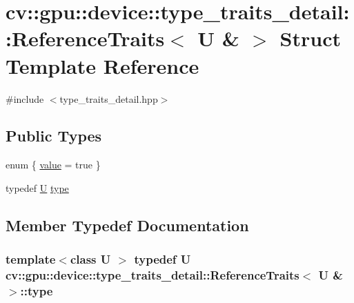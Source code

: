 \hypertarget{structcv_1_1gpu_1_1device_1_1type__traits__detail_1_1ReferenceTraits_3_01U_01_6_01_4}{\section{cv\-:\-:gpu\-:\-:device\-:\-:type\-\_\-traits\-\_\-detail\-:\-:Reference\-Traits$<$ U \& $>$ Struct Template Reference}
\label{structcv_1_1gpu_1_1device_1_1type__traits__detail_1_1ReferenceTraits_3_01U_01_6_01_4}
}


{\ttfamily \#include $<$type\-\_\-traits\-\_\-detail.\-hpp$>$}

\subsection*{Public Types}
\begin{DoxyCompactItemize}
\item 
enum \{ \hyperlink{structcv_1_1gpu_1_1device_1_1type__traits__detail_1_1ReferenceTraits_3_01U_01_6_01_4_a8141b2437f396bcbf6fe2a14651eedeca267bca8b4eb00982f3fa120355b94d8e}{value} = true
 \}
\item 
typedef \hyperlink{core__c_8h_aa9c521f41af9a5191e5e4b6ffbae211a}{U} \hyperlink{structcv_1_1gpu_1_1device_1_1type__traits__detail_1_1ReferenceTraits_3_01U_01_6_01_4_ab99a28b4c6700b91b45eb0dcd9db84bb}{type}
\end{DoxyCompactItemize}


\subsection{Member Typedef Documentation}
\hypertarget{structcv_1_1gpu_1_1device_1_1type__traits__detail_1_1ReferenceTraits_3_01U_01_6_01_4_ab99a28b4c6700b91b45eb0dcd9db84bb}{
\subsubsection[{type}]{\setlength{\rightskip}{0pt plus 5cm}template$<$class U $>$ typedef {\bf U} {\bf cv\-::gpu\-::device\-::type\-\_\-traits\-\_\-detail\-::\-Reference\-Traits}$<$ {\bf U} \& $>$\-::{\bf type}}}\label{structcv_1_1gpu_1_1device_1_1type__traits__detail_1_1ReferenceTraits_3_01U_01_6_01_4_ab99a28b4c6700b91b45eb0dcd9db84bb}


